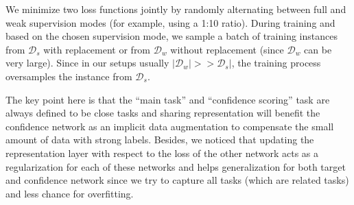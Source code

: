 We minimize two loss functions jointly by randomly alternating between full and weak supervision modes (for example, using a 1:10 ratio).
During training and based on the chosen supervision mode, we sample a batch of training instances from $\mathcal{D}_s$ with replacement or from $\mathcal{D}_w$ without replacement (since $\mathcal{D}_w$ can be very large). Since in our setups usually $|\mathcal{D}_w| >> \mathcal{D}_s|$, the training process oversamples the instance from $\mathcal{D}_s$. 

The key point here is that the ``main task'' and ``confidence scoring'' task are always defined to be close tasks and sharing representation will benefit the confidence network as an implicit data augmentation to compensate the small amount of data with strong labels.
Besides, we noticed that updating the representation layer with respect to the loss of the other network acts as a regularization for each of these networks and helps generalization for both target and confidence network since we try to capture all tasks (which are related tasks) and less chance for overfitting.

